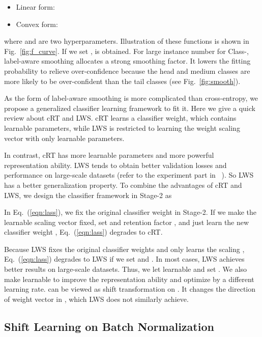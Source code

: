 \documentclass[final]{cvpr}
\begin{document}
	\begin{itemize}
		\item Linear form:
	\end{itemize}
	
	\begin{itemize}
		\item Convex form:
	\end{itemize}
	
	where  and  are two hyperparameters. Illustration of these functions is shown in Fig.~\ref{fig:f_curve}. If we set ,  is obtained. For large instance number  for Class-, label-aware smoothing allocates a strong smoothing factor. It lowers the fitting probability to relieve over-confidence because the head and medium classes are more likely to be over-confident than the tail classes (see Fig.~\ref{fig:smooth}).
	


	
	As the form of label-aware smoothing is more complicated than cross-entropy, we propose a generalized classifier learning framework to fit it. Here we give a quick review about cRT and LWS. cRT learns a classifier weight, which contains  learnable parameters, while LWS is restricted to learning the weight scaling vector  with only  learnable parameters. 
	
	In contrast, cRT has more learnable parameters and more powerful representation ability. LWS tends to obtain better validation losses and performance on large-scale datasets (refer to the experiment part in ~\cite{decouple}). So LWS has a better generalization property. To combine the advantages of cRT and LWS, we design the classifier framework in Stage-2 as
	
	In Eq.~(\ref{eqn:lass}), we fix the original classifier weight  in Stage-2. If we make the learnable scaling vector  fixed, set  and retention factor , and just learn the new classifier weight , Eq.~(\ref{eqn:lass}) degrades to cRT. 
	
	Because LWS fixes the original classifier weights  and only learns the scaling  , Eq.~(\ref{eqn:lass}) degrades to LWS if we set  and . In most cases, LWS achieves better results on large-scale datasets. Thus, we let  learnable and set . We also make  learnable to improve the representation ability and optimize  by a different learning rate.  can be viewed as shift transformation on . It changes the direction of weight vector  in , which LWS does not similarly achieve.
	


	\subsection{Shift Learning on Batch Normalization}
	
\end{document}
